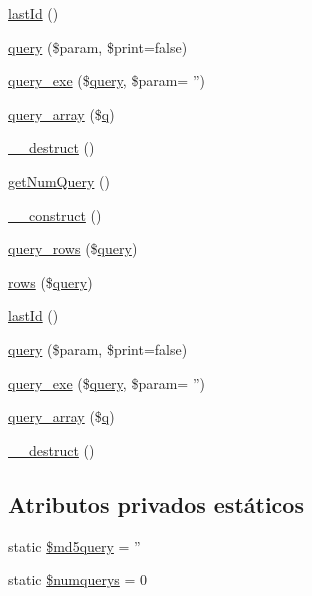 \begin{DoxyCompactItemize}
\item 
\hyperlink{classmysql_a27993b901efcccbdbb2738ffdec18f16}{last\-Id} ()
\item 
\hyperlink{classmysql_a894b10e0655909f999d9f08e293a789a}{query} (\$param, \$print=false)
\item 
\hyperlink{classmysql_a3f03bc98b3a3ca0dc3a946f626ba04bc}{query\-\_\-exe} (\$\hyperlink{classmysql_a894b10e0655909f999d9f08e293a789a}{query}, \$param= '')
\item 
\hyperlink{classmysql_af3238cdb7634f797cd87dcc85301ae1a}{query\-\_\-array} (\$\hyperlink{classdao_a57b42422089be85e61d4482406f050eb}{q})
\item 
\hyperlink{classmysql_a421831a265621325e1fdd19aace0c758}{\-\_\-\-\_\-destruct} ()
\item 
\hyperlink{classmysql_ad5420dbc0c9f855b6965dd0c08f213dc}{get\-Num\-Query} ()
\item 
\hyperlink{classmysql_a095c5d389db211932136b53f25f39685}{\-\_\-\-\_\-construct} ()
\item 
\hyperlink{classmysql_a1c50ed902c43f3060cefae287fe9bc42}{query\-\_\-rows} (\$\hyperlink{classmysql_a894b10e0655909f999d9f08e293a789a}{query})
\item 
\hyperlink{classmysql_ae94c38578a427fe7ded34c092005265f}{rows} (\$\hyperlink{classmysql_a894b10e0655909f999d9f08e293a789a}{query})
\item 
\hyperlink{classmysql_a27993b901efcccbdbb2738ffdec18f16}{last\-Id} ()
\item 
\hyperlink{classmysql_a894b10e0655909f999d9f08e293a789a}{query} (\$param, \$print=false)
\item 
\hyperlink{classmysql_a3f03bc98b3a3ca0dc3a946f626ba04bc}{query\-\_\-exe} (\$\hyperlink{classmysql_a894b10e0655909f999d9f08e293a789a}{query}, \$param= '')
\item 
\hyperlink{classmysql_af3238cdb7634f797cd87dcc85301ae1a}{query\-\_\-array} (\$\hyperlink{classdao_a57b42422089be85e61d4482406f050eb}{q})
\item 
\hyperlink{classmysql_a421831a265621325e1fdd19aace0c758}{\-\_\-\-\_\-destruct} ()
\end{DoxyCompactItemize}
\subsection*{Atributos privados estáticos}
\begin{DoxyCompactItemize}
\item 
static \hyperlink{classmysql_a1d877dee343159df5dec29991bbe99c9}{\$md5query} = ''
\item 
static \hyperlink{classmysql_a4048538572fcdaff59facadbfbd9826a}{\$numquerys} = 0
\end{DoxyCompactItemize}
